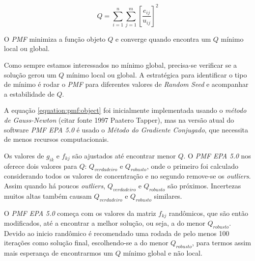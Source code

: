 \begin{equation}
  Q = \sum_{i=1}^n \sum_{j=1}^m  \left[ \frac{e_{ij}} {u_{ij}} \right] ^2
  \label{equation:pmf:object}
\end{equation}

O \textit{PMF} minimiza a função objeto $Q$ e converge quando encontra um $Q$ 
mínimo local ou global.%


Como sempre estamos interessados no mínimo global, precisa-se verificar se a 
solução gerou um $Q$ mínimo local ou global. A estratégica para identificar
o tipo de mínimo é rodar o \textit{PMF} para diferentes valores de 
\textit{Random Seed} e acompanhar a estabilidade de $Q$.

A equação \ref{equation:pmf:object} foi inicialmente implementada usando 
o \textit{método de Gauss-Newton}  (citar fonte 1997 Paatero Tapper), mas na 
versão atual do software \textit{PMF EPA 5.0} é usado o 
\textit{Método do Gradiente Conjugado}, que necessita de menos recursos 
computacionais. 

Os valores de $g_{ik}$ e $f_{kj}$ são ajustados até encontrar menor $Q$. 
O \textit{PMF EPA 5.0} nos oferece dois valores para $Q$: $Q_{verdadeiro}$ e 
$Q_{robusto}$, onde o primeiro foi calculado considerando todos os valores 
de concentração e no segundo remove-se os \textit{outliers}.
Assim quando há poucos \textit{outliers}, $Q_{verdadeiro}$ e $Q_{robusto}$ 
são próximos. Incertezas muitos altas também causam $Q_{verdadeiro}$ e 
$Q_{robusto}$ similares.

O \textit{PMF EPA 5.0} começa com os valores da matriz $f_{kj}$ randômicos, 
que são então modificados, até a encontrar a melhor solução, ou seja, 
a do menor $Q_{robusto}$. 
Devido ao inicio randômico é recomendado uma rodada de pelo menos 100 iterações 
como solução final, escolhendo-se a do menor $Q_{robusto}$, para termos assim 
mais esperança de encontrarmos um $Q$ mínimo global e não local. 



